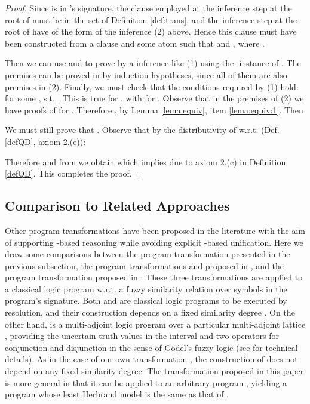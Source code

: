 \documentclass{sigplanconf}
\theoremstyle{definition}
\theoremstyle{plain}
\begin{document}
\begin{proof}
Since  is in 's signature, the clause employed at the inference step at the root of  must be in the set  of Definition \ref{def:trans}, and the inference step at the root of  have of the form of the inference (2) above. Hence this clause must have been constructed from a clause  and some atom  such that  and , where .

Then we can use  and  to prove  by  a  inference like (1) using the -instance  of . The premises can be proved in  by induction hypotheses, since all of them are also premises in (2). Finally, we must check that the conditions required by (1) hold:   for some ,  s.t. . This is true for , with  for . Observe that in the premises of (2) we have  proofs of  for . Therefore , by Lemma \ref{lema:equiv}, item \ref{lema:equiv:1}. Then


We must still prove that . Observe that by the distributivity of  w.r.t.  (Def. \ref{defQD}, axiom 2.(e)): 

Therefore  and from  we obtain  which implies  due to axiom 2.(c) in Definition \ref{defQD}. This completes the proof.
\end{proof}

\subsection{ Comparison to Related Approaches} \label{sec:RA}

Other program transformations have been proposed in the literature with the aim of supporting -based reasoning while avoiding explicit -based unification. Here we draw some comparisons between the program transformation  presented in the previous subsection, the program transformations  and  proposed  in \cite{Ses02}, and the program transformation  proposed in \cite{MOV04}. These three transformations are applied to a classical logic program  w.r.t. a fuzzy similarity relation  over symbols in the program's signature. Both  and  are classical logic programs to be executed by  resolution, and their construction depends on a fixed similarity degree . On the other hand,  is a multi-adjoint logic program over a particular multi-adjoint lattice , providing the uncertain truth values in the interval  and two operators for conjunction and disjunction in the sense of G\"{o}del's fuzzy logic (see \cite{Voj01} for technical details). As in the case of our own transformation , the construction of   does not depend on any fixed similarity degree. The transformation  proposed in this paper is more general in that it can be applied to an arbitrary  program
, yielding a  program  whose least Herbrand model is the same  as that of .
\end{document}

